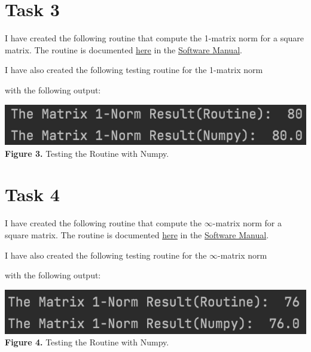\documentclass{article}
\begin{document}
\section*{Task 3}
I have created the following routine that compute the 1-matrix norm for a square matrix. The routine is documented \href{https://github.com/GoByMark/math4610/blob/main/Homework_Tasks/Tasksheet_10/src/mat1Norm.py}{here} in the \href{https://github.com/GoByMark/math4610/blob/main/Homework_Tasks/Software_Manual/Software_Manual_toc.md}{Software Manual}.

I have also created the following testing routine for the 1-matrix norm

with the following output:
\begin{center}
\includegraphics[width=\textwidth]{Screenshots/3.png}\\
{\bf Figure 3.} Testing the Routine with Numpy.
\end{center}

\section*{Task 4}
I have created the following routine that compute the $\infty$-matrix norm for a square matrix. The routine is documented \href{https://github.com/GoByMark/math4610/blob/main/Homework_Tasks/Tasksheet_10/src/matInfNorm.py}{here} in the \href{https://github.com/GoByMark/math4610/blob/main/Homework_Tasks/Software_Manual/Software_Manual_toc.md}{Software Manual}.

I have also created the following testing routine for the $\infty$-matrix norm

with the following output:
\begin{center}
\includegraphics[width=\textwidth]{Screenshots/4.png}\\
{\bf Figure 4.} Testing the Routine with Numpy.
\end{center}
\end{document}
